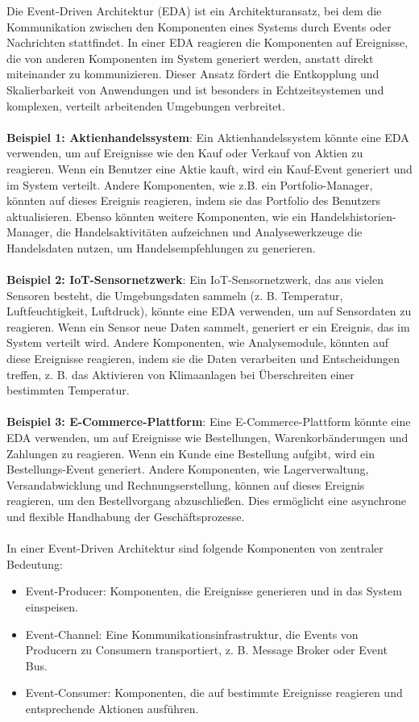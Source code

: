 \documentclass[../vs-script-first-v01.tex]{subfiles}
\begin{document}
Die Event-Driven Architektur (EDA) ist ein Architekturansatz, bei dem die Kommunikation zwischen den Komponenten eines Systems durch Events oder Nachrichten stattfindet. In einer EDA reagieren die Komponenten auf Ereignisse, die von anderen Komponenten im System generiert werden, anstatt direkt miteinander zu kommunizieren. Dieser Ansatz fördert die Entkopplung und Skalierbarkeit von Anwendungen und ist besonders in Echtzeitsystemen und komplexen, verteilt arbeitenden Umgebungen verbreitet.
\\\\
\textbf{Beispiel 1: Aktienhandelssystem}: Ein Aktienhandelssystem könnte eine EDA verwenden, um auf Ereignisse wie den Kauf oder Verkauf von Aktien zu reagieren. Wenn ein Benutzer eine Aktie kauft, wird ein Kauf-Event generiert und im System verteilt. Andere Komponenten, wie z.B. ein Portfolio-Manager, könnten auf dieses Ereignis reagieren, indem sie das Portfolio des Benutzers aktualisieren. Ebenso könnten weitere Komponenten, wie ein Handelshistorien-Manager, die Handelsaktivitäten aufzeichnen und Analysewerkzeuge die Handelsdaten nutzen, um Handelsempfehlungen zu generieren.
\\\\
\textbf{Beispiel 2: IoT-Sensornetzwerk}: Ein IoT-Sensornetzwerk, das aus vielen Sensoren besteht, die Umgebungsdaten sammeln (z. B. Temperatur, Luftfeuchtigkeit, Luftdruck), könnte eine EDA verwenden, um auf Sensordaten zu reagieren. Wenn ein Sensor neue Daten sammelt, generiert er ein Ereignis, das im System verteilt wird. Andere Komponenten, wie Analysemodule, könnten auf diese Ereignisse reagieren, indem sie die Daten verarbeiten und Entscheidungen treffen, z. B. das Aktivieren von Klimaanlagen bei Überschreiten einer bestimmten Temperatur.
\\\\
\textbf{Beispiel 3: E-Commerce-Plattform}: Eine E-Commerce-Plattform könnte eine EDA verwenden, um auf Ereignisse wie Bestellungen, Warenkorbänderungen und Zahlungen zu reagieren. Wenn ein Kunde eine Bestellung aufgibt, wird ein Bestellungs-Event generiert. Andere Komponenten, wie Lagerverwaltung, Versandabwicklung und Rechnungserstellung, können auf dieses Ereignis reagieren, um den Bestellvorgang abzuschließen. Dies ermöglicht eine asynchrone und flexible Handhabung der Geschäftsprozesse.
\\\\
In einer Event-Driven Architektur sind folgende Komponenten von zentraler Bedeutung:
\begin{itemize}
\item Event-Producer: Komponenten, die Ereignisse generieren und in das System einspeisen.
\item Event-Channel: Eine Kommunikationsinfrastruktur, die Events von Producern zu Consumern transportiert, z. B. Message Broker oder Event Bus.
\item Event-Consumer: Komponenten, die auf bestimmte Ereignisse reagieren und entsprechende Aktionen ausführen.
\end{itemize}
\end{document}
